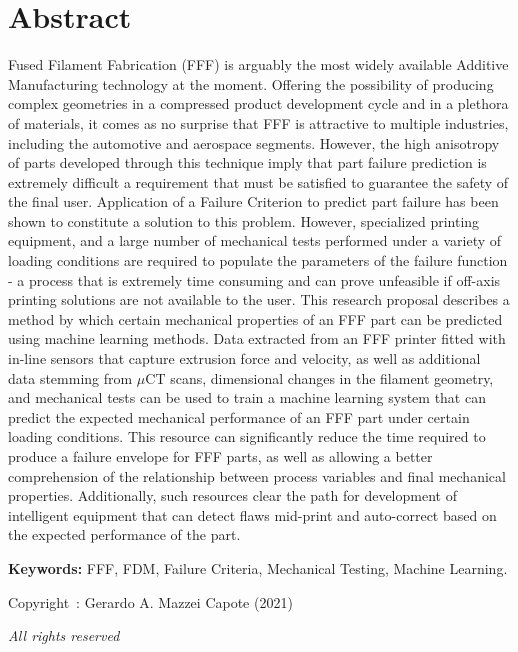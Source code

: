 \documentclass[main.tex]{subfiles}
\begin{document}
\setcounter{page}{1}
\chapter*{Abstract}
Fused Filament Fabrication (FFF) is arguably the most widely available Additive Manufacturing technology at the moment. Offering the possibility of producing complex geometries in a compressed product development cycle and in a plethora of materials, it comes as no surprise that FFF is attractive to multiple industries, including the automotive and aerospace segments. However, the high anisotropy of parts developed through this technique imply that part failure prediction is extremely difficult \textemdash a requirement that must be satisfied to guarantee the safety of the final user. Application of a Failure Criterion to predict part failure has been shown to constitute a solution to this problem. However, specialized printing equipment, and a large number of mechanical tests performed under a variety of loading conditions are required to populate the parameters of the failure function - a process that is extremely time consuming and can prove unfeasible if off-axis printing solutions are not available to the user. This research proposal describes a method by which certain mechanical properties of an FFF part can be predicted using machine learning methods. Data extracted from an FFF printer fitted with in-line sensors that capture extrusion force and velocity, as well as additional data stemming from $\mu$CT scans, dimensional changes in the filament geometry, and mechanical tests can be used to train a machine learning system that can predict the expected mechanical performance of an FFF part under certain loading conditions. This resource can significantly reduce the time required to produce a failure envelope for FFF parts, as well as allowing a better comprehension of the relationship between process variables and final mechanical properties. Additionally, such resources clear the path for development of intelligent equipment that can detect flaws mid-print and auto-correct based on the expected performance of the part.  
 
\vspace{10mm} %
\textbf{Keywords:} FFF, FDM, Failure Criteria, Mechanical Testing, Machine Learning.

\vfill %
\begin{center}
Copyright~\textcopyright: Gerardo A. Mazzei Capote (2021)

\emph{All rights reserved}	
\end{center}
\end{document}
